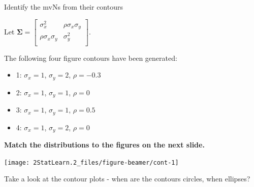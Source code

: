 \documentclass[ignorenonframetext,]{beamer}
\providecommand{\tightlist}{%
  \setlength{\itemsep}{0pt}\setlength{\parskip}{0pt}}
\begin{document}
\begin{frame}

\begin{block}{Identify the mvNs from their contours}

\vspace{4mm}

Let
\(\boldsymbol\Sigma=\left[\begin{array}{cc} \sigma_x^2 & \rho\sigma_{x}\sigma_{y}\\\rho\sigma_{x}\sigma_{y}&\sigma_y^2\\ \end{array} \right]\).

\vspace{4mm} The following four figure contours have been generated:

\begin{itemize}
\tightlist
\item
  1: \(\sigma_x=1\), \(\sigma_y=2\), \(\rho=-0.3\)
\item
  2: \(\sigma_x=1\), \(\sigma_y=1\), \(\rho=0\)
\item
  3: \(\sigma_x=1\), \(\sigma_y=1\), \(\rho=0.5\)
\item
  4: \(\sigma_x=1\), \(\sigma_y=2\), \(\rho=0\)
\end{itemize}

\vspace{8mm}

\textbf{Match the distributions to the figures on the next slide.}

\end{block}

\end{frame}

\begin{frame}

\begin{center}\texttt{[image: 2StatLearn.2\_files/figure-beamer/cont-1]} \end{center}

Take a look at the contour plots - when are the contours circles, when
ellipses?

\end{frame}
\end{document}

